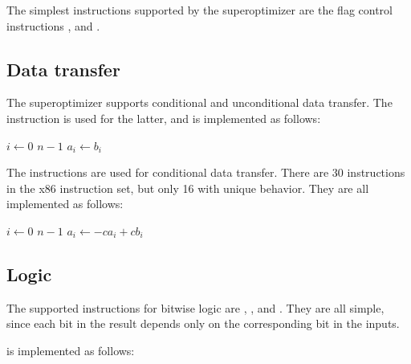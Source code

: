 \documentclass[a4paper,11pt]{kth-mag}
\renewcommand{\gets}{\leftarrow}
\newcommand{\AND}{}
\newcommand{\IOR}{+}
\newcommand{\NOT}{-}
\begin{document}
The simplest instructions supported by the superoptimizer are the flag control instructions ,  and .

\subsection{Data transfer}

The superoptimizer supports conditional and unconditional data transfer.
The  instruction is used for the latter, and is implemented as follows:

\begin{codebox}
\zi \For $i \gets 0$ \To $n-1$
\zi \Do
      $a_i \gets b_i$
    \End
\end{codebox}

The  instructions are used for conditional data transfer.
There are 30  instructions in the x86 instruction set, but only 16 with unique behavior.
They are all implemented as follows:

\begin{codebox}
\zi \For $i \gets 0$ \To $n-1$
\zi \Do
      $a_i \gets \NOT c \AND a_i \IOR c \AND b_i$
    \End
\end{codebox}




\subsection{Logic}

The supported instructions for bitwise logic are , ,  and .
They are all simple, since each bit in the result depends only on the corresponding bit in the inputs.

 is implemented as follows:
\end{document}
